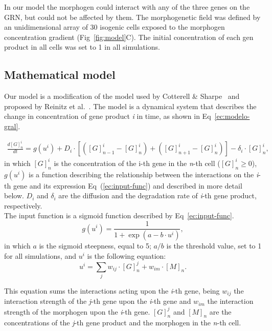 \documentclass[10pt,letterpaper]{article}
\begin{document}
In our model the morphogen could interact with any of the three genes on the
GRN, but could not be affected by them. The morphogenetic field was defined by
an unidimensional array of 30 isogenic cells exposed to the morphogen
concentration gradient (Fig~\ref{fig:model}C). The initial concentration of
each gen product in all cells was set to 1 in all simulations.\\

\subsection*{Mathematical model}

Our model is a modification of the model used by Cotterell \& Sharpe~\cite{Cotterell2010}
and proposed by Reinitz et al.~\cite{Reinitz1995}. The
model is a dynamical system that describes the change in concentration of gene
product \emph{i} in time, as shown in Eq~\ref{ec:modelo-gral}.

 \begin{eqnarray}
  \frac{d[G]^i_n}{dt}
  = g(u^i) + D_i \cdot [ ([G]^i_{n-1}-[G]^i_n) +([G]^i_{n+1}-[G]^i_n)]-\delta_i
  \cdot [ G ]^i_n ,
  \label{ec:modelo-gral}
 \end{eqnarray}
\noindent
in which $[G]^{i}_{n}$ is the concentration of the i-th gene in the \emph{n}-th
cell ($[G]^{i}_{n} ≥ 0$), $g(u^i)$ is a function describing the relationship
between the interactions on the \emph{i}-th gene and its expression
Eq~(\ref{ec:input-func}) and described in more detail below. $D_i$ and
$\delta_i$ are the diffusion and the degradation rate of \emph{i}-th gene
product, respectively.\\

The input function is a sigmoid function described by Eq~\ref{ec:input-func}.
\begin{equation}
 g(u^i) = \frac{1}{1 + \exp(a - b \cdot u^i)},
 \label{ec:input-func}
\end{equation}
\noindent
in which $a$ is the sigmoid steepness, equal to 5; $a/b$ is the threshold value,
set to 1 for all simulations, and $u^i$ is the following equation:
\begin{equation}
 u^i = \sum_j w_{ij} \cdot [G]^j_n + w_{im} \cdot [M]_n.
 \label{ec:mat-sum}
\end{equation}

This equation sums the interactions acting upon the \emph{i}-th gene, being
$w_{ij}$ the interaction strength of the \emph{j}-th gene upon the \emph{i}-th
gene and $w_{im}$ the interaction strength of the morphogen upon the \emph{i}-th
gene. $[G]^j_n$ and $[M]_n$ are the concentrations of the \emph{j}-th gene
product and the morphogen in the \emph{n}-th cell.
\end{document}

